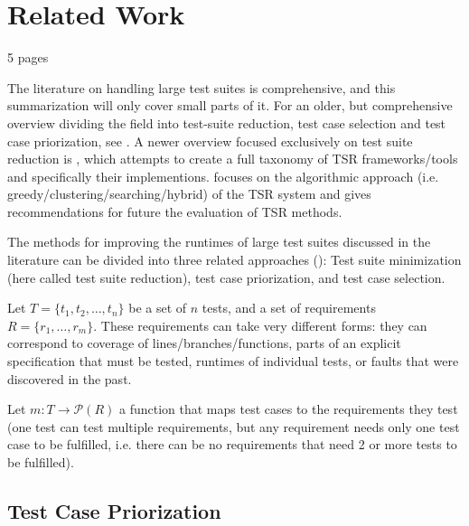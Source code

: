 
\chapter{Related Work}\label{chapter:related}


5 pages

The literature on handling large test suites is comprehensive, and
this summarization will only cover small parts of it. For an older,
but comprehensive overview dividing the field into test-suite
reduction, test case selection and test case priorization, see
\cite{yoo2012regression}. A newer overview focused exclusively on
test suite reduction is \cite{khan2016survey}, which attempts to
create a full taxonomy of TSR frameworks/tools and specifically their
implementions. \cite{khan2018systematic} focuses on the algorithmic
approach (i.e. greedy/clustering/searching/hybrid) of the TSR system
and gives recommendations for future the evaluation of TSR methods.

The methods for improving the runtimes of large test suites discussed
in the literature can be divided into three related approaches
(\cite{yoo2012regression}): Test suite minimization (here called test
suite reduction), test case priorization, and test case selection.



Let $T=\{t_1, t_2, \dots, t_n\}$ be a set of $n$ tests, and a
set of requirements $R=\{r_1, \dots, r_m\}$. These requirements
can take very different forms: they can correspond to coverage of
lines/branches/functions, parts of an explicit specification that must
be tested, runtimes of individual tests, or faults that were discovered
in the past.

Let $m: T \rightarrow \mathcal{P}(R)$ a function that maps test cases
to the requirements they test (one test can test multiple requirements,
but any requirement needs only one test case to be fulfilled, i.e. there
can be no requirements that need 2 or more tests to be fulfilled).

\section{Test Case Priorization}


